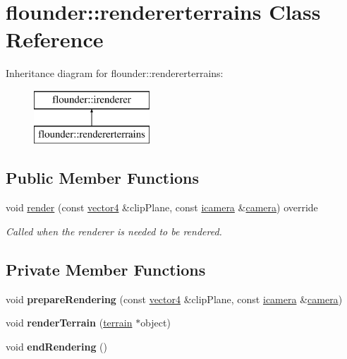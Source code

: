 \hypertarget{classflounder_1_1rendererterrains}{}\section{flounder\+:\+:rendererterrains Class Reference}
\label{classflounder_1_1rendererterrains}
Inheritance diagram for flounder\+:\+:rendererterrains\+:\begin{figure}[H]
\begin{center}
\leavevmode
\includegraphics[height=2.000000cm]{classflounder_1_1rendererterrains}
\end{center}
\end{figure}
\subsection*{Public Member Functions}
\begin{DoxyCompactItemize}
\item 
void \hyperlink{classflounder_1_1rendererterrains_a3e8560c23b117b52a369a8f17b2bd39e}{render} (const \hyperlink{classflounder_1_1vector4}{vector4} \&clip\+Plane, const \hyperlink{classflounder_1_1icamera}{icamera} \&\hyperlink{classflounder_1_1camera}{camera}) override
\begin{DoxyCompactList}\small\item\em Called when the renderer is needed to be rendered. \end{DoxyCompactList}\end{DoxyCompactItemize}
\subsection*{Private Member Functions}
\begin{DoxyCompactItemize}
\item 
\mbox{\label{classflounder_1_1rendererterrains_a2c4a14e73d479d21f8433e741d30bb29}} 
void {\bfseries prepare\+Rendering} (const \hyperlink{classflounder_1_1vector4}{vector4} \&clip\+Plane, const \hyperlink{classflounder_1_1icamera}{icamera} \&\hyperlink{classflounder_1_1camera}{camera})
\item 
\mbox{\label{classflounder_1_1rendererterrains_a3892d9d91c25d7e3bcea96ed183c3a36}} 
void {\bfseries render\+Terrain} (\hyperlink{classflounder_1_1terrain}{terrain} $\ast$object)
\item 
\mbox{\label{classflounder_1_1rendererterrains_abd28b295f53419ec7a712ae30fd1f9ef}} 
void {\bfseries end\+Rendering} ()
\end{DoxyCompactItemize}
